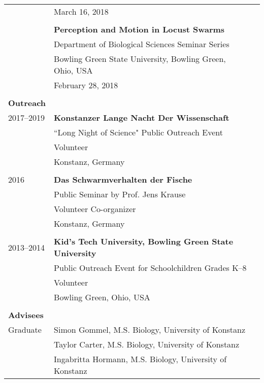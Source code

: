 \documentclass[letterpaper,10pt,oneside]{article}
\begin{document}
\begin{small}
\begin{longtable}{@{} l p{5.3in}l}
& March 16, 2018 \\
& \\
& \textbf{Perception and Motion in Locust Swarms} \\
& Department of Biological Sciences Seminar Series \\
& Bowling Green State University, Bowling Green, Ohio, USA \\
& February 28, 2018 \\
& \\
 \Large{\textbf{Outreach}}  \vspace{5mm} \\
\large{2017--2019}
& \textbf{Konstanzer Lange Nacht Der Wissenschaft} \\
& ``Long Night of Science" Public Outreach Event \\
& Volunteer \\
& Konstanz, Germany \\
& \\
\large{2016}
& \textbf{Das Schwarmverhalten der Fische} \\
& Public Seminar by Prof. Jens Krause \\
& Volunteer Co-organizer \\
& Konstanz, Germany \\
& \\
\large{2013–2014}
& \textbf{Kid's Tech University, Bowling Green State University} \\
& Public Outreach Event for Schoolchildren Grades K–8 \\
& Volunteer \\
& Bowling Green, Ohio, USA \\
& \\

 \Large{\textbf{Advisees}}  \vspace{5mm} \\
 \large{Graduate} 
 & Simon Gommel, M.S. Biology, University of Konstanz \\
 & Taylor Carter, M.S. Biology, University of Konstanz \\
 & Ingabritta Hormann, M.S. Biology, University of Konstanz \\


\end{longtable}
\end{small}
\end{document}
